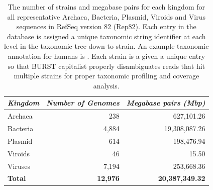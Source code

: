 \begin{table}[hbt]
  \centering
  \begin{tabular}{l|r|r}
      \textit{Kingdom} & \textit{Number of Genomes} & \textit{Megabase pairs (Mbp)} \\ \hline
      Archaea & 238 & 627,101.26\\ \hline
      Bacteria & 4,884 & 19,308,087.26\\ \hline
      Plasmid & 614 & 198,476.94\\ \hline
      Viroids & 46 & 15.50\\ \hline
      Viruses & 7,194 & 253,668.36\\ \hline \hline
      \textbf{Total} & \textbf{12,976} & \textbf{20,387,349.32}\\ 
  \end{tabular}
  \caption{
        The number of strains and megabase pairs for each kingdom for all representative Archaea, Bacteria, Plasmid, Viroids and Virus sequences in RefSeq version 82 (Rep82). Each entry in the database is assigned a unique taxonomic string identifier at each level in the taxonomic tree down to strain. An example taxonomic annotation for humans is . Each strain is a given a unique entry so that BURST capitalist properly disambiguates reads that hit multiple strains for proper taxonomic profiling and coverage analysis. 
  }
  \label{tab:database_stats}
\end{table}

